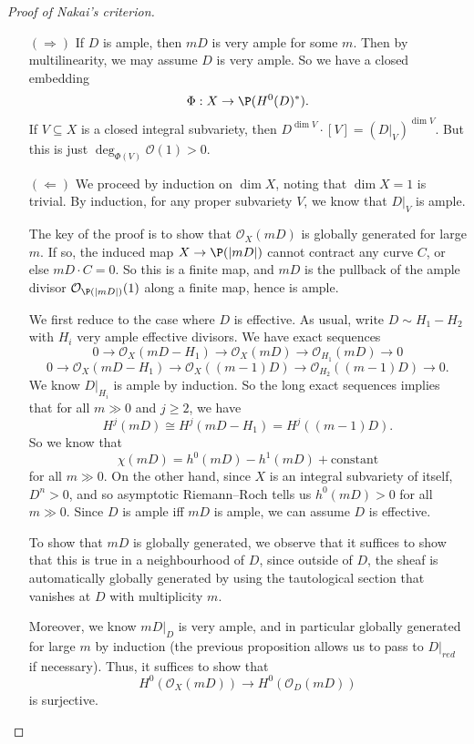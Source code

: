 \documentclass[a4paper]{article}
\begin{document}
\begin{proof}[Proof of Nakai's criterion]\leavevmode
  \begin{itemize}
    \item[$(\Rightarrow)$] If $D$ is ample, then $mD$ is very ample for some $m$. Then by multilinearity, we may assume $D$ is very ample. So we have a closed embedding
      \[
        \Phi: X \to \P(H^0(D)^*).
      \]
      If $V \subseteq X$ is a closed integral subvariety, then $D^{\dim V} \cdot [V] = (D|_V)^{\dim V}$. But this is just $\deg_{\Phi(V)} \mathcal{O}(1) > 0$.
    \item[$(\Leftarrow)$] We proceed by induction on $\dim X$, noting that $\dim X = 1$ is trivial. By induction, for any proper subvariety $V$, we know that $D|_V$ is ample.
      
      The key of the proof is to show that $\mathcal{O}_X(mD)$ is globally generated for large $m$. If so, the induced map $X \to \P(|mD|)$ cannot contract any curve $C$, or else $mD \cdot C = 0$. So this is a finite map, and $mD$ is the pullback of the ample divisor $\mathcal{O}_{\P(|mD|)}(1)$ along a finite map, hence is ample.

      We first reduce to the case where $D$ is effective. As usual, write $D \sim H_1 - H_2$ with $H_i$ very ample effective divisors. We have exact sequences
      \[
        0 \to \mathcal{O}_X(mD - H_1) \to \mathcal{O}_X(mD) \to \mathcal{O}_{H_1}(mD) \to 0
      \]
      \[
        0 \to \mathcal{O}_X(mD - H_1) \to \mathcal{O}_X((m - 1)D) \to \mathcal{O}_{H_2}((m - 1)D) \to 0.
      \]
      We know $D|_{H_i}$ is ample by induction. So the long exact sequences implies that for all $m \gg 0$ and $j \geq 2$, we have
      \[
        H^j(mD) \cong H^j(mD - H_1) = H^j((m - 1)D).
      \]
      So we know that
      \[
        \chi(mD) = h^0(mD) - h^1(mD) + \text{constant}
      \]
      for all $m \gg 0$. On the other hand, since $X$ is an integral subvariety of itself, $D^n > 0$, and so asymptotic Riemann--Roch tells us $h^0(mD) > 0$ for all $m \gg 0$. Since $D$ is ample iff $mD$ is ample, we can assume $D$ is effective.

      To show that $mD$ is globally generated, we observe that it suffices to show that this is true in a neighbourhood of $D$, since outside of $D$, the sheaf is automatically globally generated by using the tautological section that vanishes at $D$ with multiplicity $m$.
      
      Moreover, we know $mD|_D$ is very ample, and in particular globally generated for large $m$ by induction (the previous proposition allows us to pass to $D|_{red}$ if necessary). Thus, it suffices to show that
      \[
        H^0(\mathcal{O}_X(mD)) \to H^0(\mathcal{O}_D(mD))
      \]
      is surjective.


\end{itemize}
\end{proof}
\end{document}

